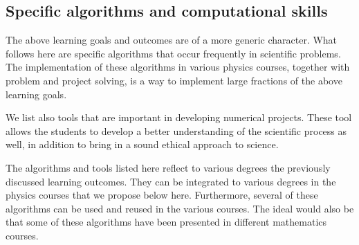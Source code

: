 \documentclass[%
oneside,                 %
final,                   %
10pt]{article}
\begin{document}
\noindent
\subsection{Specific algorithms and computational skills}

The above learning goals and outcomes are of a more generic character. What follows here are specific 
algorithms that occur frequently in scientific problems. The implementation of these algorithms in various physics courses, together with problem and project solving, is a way to implement large fractions of the above learning goals. 

We list also tools that are important in developing
numerical projects. These tool allows the students to develop a better understanding of the scientific process as well, in addition to bring in a sound ethical approach to science.

The algorithms and tools listed here reflect to various degrees the previously discussed learning outcomes. They can be integrated to various degrees in the physics courses that we propose below here. Furthermore, several of these algorithms can be used and reused in the various courses. The ideal would also be that some of these algorithms have been presented in different mathematics courses.
\end{document}

